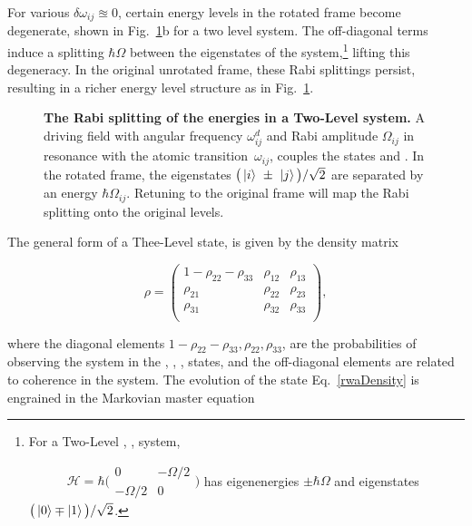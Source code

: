   \noindent For various $ \delta\omega_{ij} \approxeq 0$, certain energy levels in the rotated frame become degenerate, shown in Fig.~\ref{theoRotation}b for a two level system. The off-diagonal terms induce a splitting $ \hbar\Omega $ between the eigenstates of the system,\footnote{For a Two-Level , , system,
  
  $\qquad\quad \mathcal{H} = \hbar\big(\begin{smallmatrix}0 & -\Omega/2\\-\Omega/2&0\end{smallmatrix}\big) $ has eigenenergies $ \pm\hbar\Omega $ and eigenstates $ \big(\Ket{0}\mp\Ket{1}\big)/\sqrt{2} $.} lifting this degeneracy. In the original unrotated frame, these Rabi splittings persist, resulting in a richer energy level structure as in Fig.~\ref{theoRotation}.
  
  \begin{figure}
  	\caption{\textbf{The Rabi splitting of the energies in a Two-Level system.} A driving field with angular frequency $ \omega_{ij}^{d} $ and Rabi amplitude $ \Omega_{ij} $ in resonance with the atomic transition~$ \omega_{ij} $, couples the states  and . In the rotated frame, the eigenstates $ \big(\Ket{i}~\pm~\Ket{j}\big)/\sqrt{2} $ are separated by an energy $ \hbar\Omega_{ij} $. Retuning to the original frame will map the Rabi splitting onto the original levels.}
  	\label{theoRotation}
  \end{figure}
  
  The general form of a Thee-Level state, is given by the density matrix \cite{quantumOptics}
  
  \begin{equation}
	  \rho = \begin{pmatrix}
	  1-\rho_{22}-\rho_{33} & \rho_{12} & \rho_{13}\\
	  \rho_{21} & \rho_{22} & \rho_{23}\\
	  \rho_{31} & \rho_{32} & \rho_{33}\\
	  \end{pmatrix},
	  \label{rwaDensity}
  \end{equation} 
  
  \noindent where the diagonal elements $ 1-\rho_{22}-\rho_{33}, \rho_{22}, \rho_{33} $, are the probabilities of observing the system in the , , , states, and the off-diagonal elements are related to coherence in the system.  The evolution of the state Eq.~\eqref{rwaDensity} is engrained in the Markovian master equation \cite{zoller}
  

